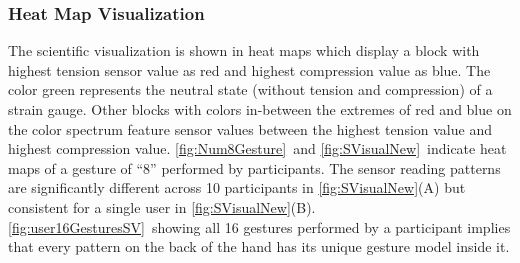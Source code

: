 \documentclass{sigchi}
\begin{document}
\subsubsection{Heat Map Visualization}
The scientific visualization is shown in heat maps which display a block with highest tension sensor value as red and highest compression value as blue. The color green represents the neutral state (without tension and compression) of a strain gauge. Other blocks with colors in-between the extremes of red and blue on the color spectrum feature sensor values between the highest tension value and highest compression value. \autoref{fig:Num8Gesture}\ and \autoref{fig:SVisualNew}\ indicate heat maps of a gesture of ``8'' performed by participants. The sensor reading patterns are significantly different across 10 participants in \autoref{fig:SVisualNew}(A) but consistent for a single user in \autoref{fig:SVisualNew}(B). \autoref{fig:user16GesturesSV}\ showing all 16 gestures performed by a participant implies that every pattern on the back of the hand has its unique gesture model inside it.

\end{document}
